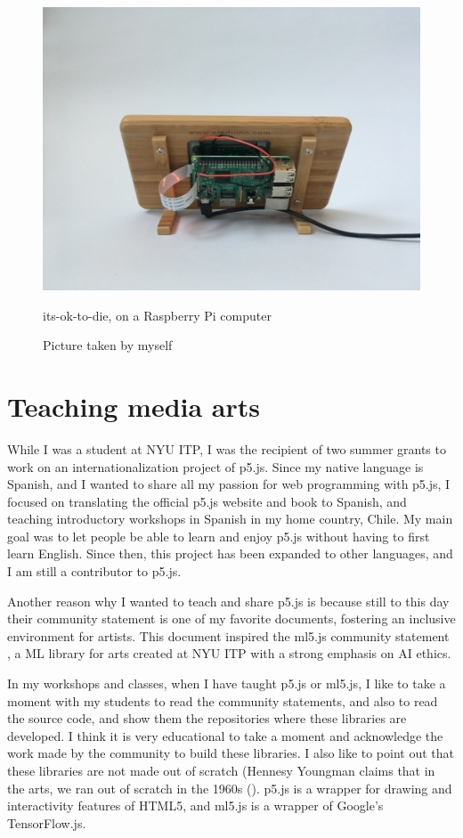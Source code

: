 \begin{figure}[ht]
  \centering
  \includegraphics[width=0.75\linewidth,height=0.35\textheight,keepaspectratio]{images/its-ok-to-die-raspberry.jpg}
  \caption{its-ok-to-die, on a Raspberry Pi computer}
  \caption*{Picture taken by myself}
  \label{fig:its-ok-to-die-raspberry}
\end{figure}

\section{Teaching media arts}

While I was a student at \acrshort{NYU} \acrshort{ITP}, I was the recipient of two summer grants to work on an internationalization project of p5.js. Since my native language is Spanish, and I wanted to share all my passion for web programming with p5.js, I focused on translating the official p5.js website and book to Spanish, and teaching introductory workshops in Spanish in my home country, Chile. My main goal was to let people be able to learn and enjoy p5.js without having to first learn English. Since then, this project has been expanded to other languages, and I am still a contributor to p5.js.

Another reason why I wanted to teach and share p5.js is because still to this day their community statement \cite{website-p5js-community-statement} is one of my favorite documents, fostering an inclusive environment for artists. This document inspired the ml5.js community statement \cite{website-ml5js-community-statement}, a \acrshort{ML} library for arts created at \acrshort{NYU} \acrshort{ITP} with a strong emphasis on \acrshort{AI} ethics.

In my workshops and classes, when I have taught p5.js or ml5.js, I like to take a moment with my students to read the community statements, and also to read the source code, and show them the repositories where these libraries are developed. I think it is very educational to take a moment and acknowledge the work made by the community to build these libraries. I also like to point out that these libraries are not made out of scratch (Hennesy Youngman claims that in the arts, we ran out of scratch in the 1960s (\cite{hennesy-youngman-art-thoughtz-how-to-make-an-art}). p5.js is a wrapper for drawing and interactivity features of HTML5, and ml5.js is a wrapper of Google's TensorFlow.js.


